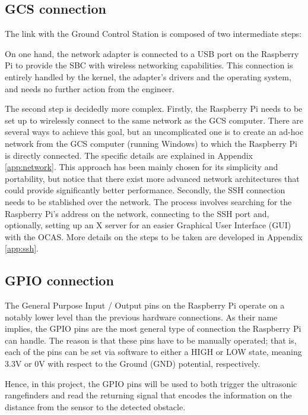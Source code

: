 \subsection{GCS connection}
The link with the Ground Control Station is composed of two intermediate steps:

On one hand, the network adapter is connected to a USB port on the Raspberry Pi to provide the SBC with wireless networking capabilities.
This connection is entirely handled by the kernel, the adapter's drivers and the operating system, and needs no further action from the engineer.

The second step is decidedly more complex.
Firstly, the Raspberry Pi needs to be set up to wirelessly connect to the same network as the GCS computer.
There are several ways to achieve this goal, but an uncomplicated one is to create an ad-hoc network from the GCS computer (running Windows) to which the Raspberry Pi is directly connected.
The specific details are explained in Appendix \ref{app:network}.
This approach has been mainly chosen for its simplicity and portability, but notice that there exist more advanced network architectures that could provide significantly better performance.
Secondly, the SSH connection needs to be stablished over the network.
The process involves searching for the Raspberry Pi's address on the network, connecting to the SSH port and, optionally, setting up an X server for an easier Graphical User Interface (GUI) with the OCAS.
More details on the steps to be taken are developed in Appendix \ref{app:ssh}.

\subsection{GPIO connection}

The General Purpose Input / Output pins on the Raspberry Pi operate on a notably lower level than the previous hardware connections.
As their name implies, the GPIO pins are the most general type of connection the Raspberry Pi can handle.
The reason is that these pins have to be manually operated; that is, each of the pins can be set via software to either a HIGH or LOW state, meaning 3.3V or 0V with respect to the Ground (GND) potential, respectively.

Hence, in this project, the GPIO pins will be used to both trigger the ultrasonic rangefinders and read the returning signal that encodes the information on the distance from the sensor to the detected obstacle.

